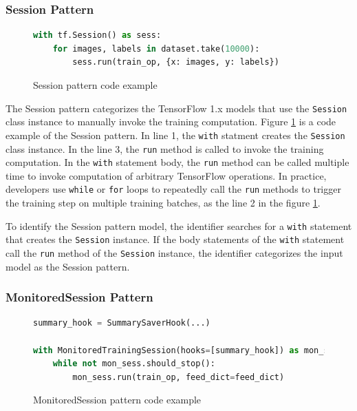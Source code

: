 \subsubsection{Session Pattern}

\begin{figure}[!ht]
\begin{lstlisting}[language=Python]
with tf.Session() as sess:
    for images, labels in dataset.take(10000):
        sess.run(train_op, {x: images, y: labels})
\end{lstlisting}
\caption{Session pattern code example}
\label{fig:sessionpattern}
\end{figure}

The Session pattern categorizes the TensorFlow 1.x models that
use the {\tt Session} class instance to manually invoke the training 
computation. Figure \ref{fig:sessionpattern} is a code example of the Session 
pattern. In line 1, the {\tt with} statment creates the {\tt Session}
class instance. In the line 3, the {\tt run} method is called to invoke 
the training computation. 
In the {\tt with} statement body, the {\tt run} method can be called multiple
time to invoke computation of arbitrary TensorFlow operations.
In practice, developers use {\tt while} or {\tt for} loops to repeatedly call
the {\tt run} methods to trigger the training step on multiple training batches,
as the line 2 in the figure \ref{fig:sessionpattern}.

To identify the Session pattern model, the identifier 
searches for a {\tt with} statement that creates the {\tt Session} instance.
If the body statements of the {\tt with} statement call the 
{\tt run} method of the {\tt Session} instance,
the identifier categorizes the input model as the Session pattern. 


\subsubsection{MonitoredSession Pattern}

\begin{figure}[!ht]
  \begin{lstlisting}[language=Python]
summary_hook = SummarySaverHook(...)

with MonitoredTrainingSession(hooks=[summary_hook]) as mon_sess:
    while not mon_sess.should_stop():
        mon_sess.run(train_op, feed_dict=feed_dict)
  \end{lstlisting}
  \caption{MonitoredSession pattern code example}
  \label{fig:monsesspattern}
\end{figure}

